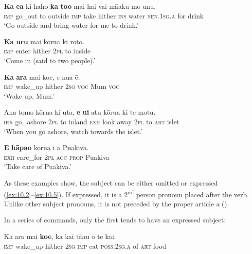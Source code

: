 \ea\label{ex:10.1}
\gll \textbf{Ka} \textbf{e{\ꞌ}a} ki haho \textbf{ka} \textbf{to{\ꞌ}o} mai hai vai mā{\ꞌ}aku mo unu. \\
\textsc{imp} go\_out to outside \textsc{imp} take hither \textsc{ins} water \textsc{ben.1sg.a} for drink \\

\glt 
‘Go outside and bring water for me to drink.’ \textstyleExampleref{[R229.231]} 
\z

\ea\label{ex:10.2}
\gll \textbf{Ka} \textbf{uru} mai kōrua ki roto. \\
\textsc{imp} enter hither \textsc{2pl} to inside \\

\glt 
‘Come in (said to two people).’ \textstyleExampleref{[R229.261]} 
\z

\ea\label{ex:10.3}
\gll \textbf{Ka} \textbf{{\ꞌ}ara} mai koe, e nua ē. \\
\textsc{imp} wake\_up hither \textsc{2sg} \textsc{voc} Mum \textsc{voc} \\

\glt 
‘Wake up, Mum.’ \textstyleExampleref{[R229.315]} 
\z

\ea\label{ex:10.4}
\gll Ana tomo kōrua ki {\ꞌ}uta, \textbf{e} \textbf{u{\ꞌ}i} atu kōrua ki te motu.\\
\textsc{irr} go\_ashore \textsc{2pl} to inland \textsc{exh} look away \textsc{2pl} to \textsc{art} islet\\

\glt 
‘When you go ashore, watch towards the islet.’ \textstyleExampleref{[Ley-2-02.005]}
\z

\ea\label{ex:10.5}
\gll \textbf{E} \textbf{hāpa{\ꞌ}o} kōrua i a Puakiva. \\
\textsc{exh} care\_for \textsc{2pl} \textsc{acc} \textsc{prop} Puakiva \\

\glt
‘Take care of Puakiva.’ \textstyleExampleref{[R229.420–421]}
\z

As these examples show, the subject can be either omitted  or expressed (\ref{ex:10.2}–\ref{ex:10.5}). If expressed, it is a 2\textsuperscript{nd} person pronoun placed after the verb. Unlike other subject pronouns, it is not preceded by the proper article \textit{a} (). 

In a series of commands, only the first  tends to have an expressed subject:

\ea\label{ex:10.6}
\gll Ka {\ꞌ}ara mai \textbf{koe}, ka kai tā{\ꞌ}au o te kai. \\
\textsc{imp} wake\_up hither \textsc{2sg} \textsc{imp} eat \textsc{poss.2sg.a} of \textsc{art} food \\

